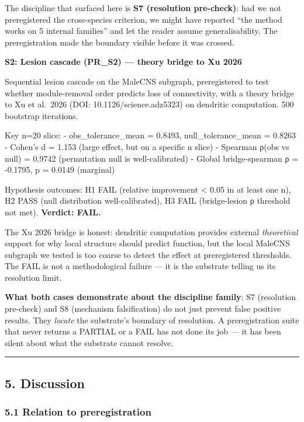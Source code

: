 \documentclass[
]{article}
\begin{document}
The discipline that surfaced here is \textbf{S7 (resolution pre-check)}:
had we not preregistered the cross-species criterion, we might have
reported ``the method works on 5 internal families'' and let the reader
assume generalisability. The preregistration made the boundary visible
before it was crossed.

\textbf{S2: Lesion cascade (PR\_S2) --- theory bridge to Xu 2026}

Sequential lesion cascade on the MaleCNS subgraph, preregistered to test
whether module-removal order predicts loss of connectivity, with a
theory bridge to Xu et al.~2026 (DOI: 10.1126/science.adz5323) on
dendritic computation. 500 bootstrap iterations.

Key n=20 slice: - obs\_tolerance\_mean = 0.8493, null\_tolerance\_mean =
0.8263 - Cohen's d = 1.153 (large effect, but on a specific n slice) -
Spearman ρ(obs vs null) = 0.9742 (permutation null is well-calibrated) -
Global bridge-spearman ρ = -0.1795, p = 0.0149 (marginal)

Hypothesis outcomes: H1 FAIL (relative improvement \textless{} 0.05 in
at least one n), H2 PASS (null distribution well-calibrated), H3 FAIL
(bridge-lesion ρ threshold not met). \textbf{Verdict: FAIL.}

The Xu 2026 bridge is honest: dendritic computation provides external
\emph{theoretical} support for why local structure should predict
function, but the local MaleCNS subgraph we tested is too coarse to
detect the effect at preregistered thresholds. The FAIL is not a
methodological failure --- it is the substrate telling us its resolution
limit.

\textbf{What both cases demonstrate about the discipline family}: S7
(resolution pre-check) and S8 (mechanism falsification) do not just
prevent false positive results. They \emph{locate} the substrate's
boundary of resolution. A preregistration suite that never returns a
PARTIAL or a FAIL has not done its job --- it has been silent about what
the substrate cannot resolve.

\begin{center}\rule{0.5\linewidth}{0.5pt}\end{center}

\subsection{5. Discussion}\label{discussion}

\subsubsection{5.1 Relation to
preregistration}\label{relation-to-preregistration}
\end{document}

